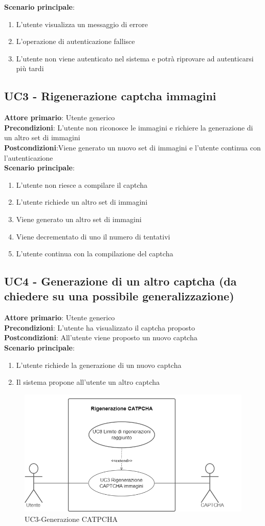 \textbf{Scenario principale}:
\begin{enumerate}
	\item L’utente visualizza un messaggio di errore
	\item L’operazione di autenticazione fallisce
	\item L’utente non viene autenticato nel sistema e potrà  riprovare ad autenticarsi più tardi
\end{enumerate}

\subsection{UC3 - Rigenerazione captcha immagini}
\textbf{Attore primario}: Utente generico\\
\textbf{Precondizioni}: L'utente non riconosce le immagini e richiere la generazione di un altro set di immagini\\
\textbf{Postcondizioni}:Viene generato un nuovo set di immagini e l'utente continua con l'autenticazione\\

\textbf{Scenario principale}:
\begin{enumerate}
   \item L'utente non riesce a compilare il captcha
   \item L'utente richiede un altro set di immagini
   \item Viene generato un altro set di immagini
   \item Viene decrementato di uno il numero di tentativi
   \item L'utente continua con la compilazione del captcha
\end{enumerate}

\subsection{UC4 - Generazione di un altro captcha (da chiedere su una possibile generalizzazione)}
\textbf{Attore primario}: Utente generico\\
\textbf{Precondizioni}: L'utente ha visualizzato il captcha proposto\\
\textbf{Postcondizioni}: All'utente viene proposto un nuovo captcha\\

\textbf{Scenario principale}:
\begin{enumerate}
   \item L'utente richiede la generazione di un nuovo captcha
   \item Il sistema propone all'utente un altro captcha
\end{enumerate}

\begin{figure}[H]
    \centering
    \includegraphics[scale=0.6]{img/Generazione_catpcha.png}
    \caption{UC3-Generazione CATPCHA}
\end{figure}